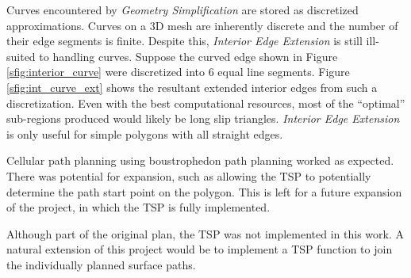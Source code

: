 Curves encountered by \textit{Geometry Simplification} are stored as discretized approximations.
Curves on a 3D mesh are inherently discrete and the number of their edge segments is finite.
Despite this, \textit{Interior Edge Extension} is still ill-suited to handling curves.
Suppose the curved edge shown in Figure \ref{sfig:interior_curve} were discretized into 6 equal line segments.
Figure \ref{sfig:int_curve_ext} shows the resultant extended interior edges from such a discretization.
Even with the best computational resources, most of the ``optimal'' sub-regions produced would likely be long slip triangles.
\textit{Interior Edge Extension} is only useful for simple polygons with all straight edges.

Cellular path planning using boustrophedon path planning worked as expected.
There was potential for expansion, such as allowing the TSP to potentially determine the path start point on the polygon.
This is left for a future expansion of the project, in which the TSP is fully implemented.

Although part of the original plan, the TSP was not implemented in this work.
A natural extension of this project would be to implement a TSP function to join the individually planned surface paths.

